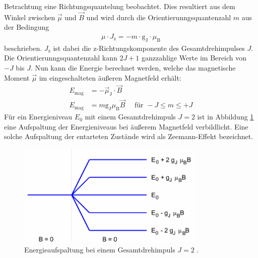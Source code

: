 Betrachtung eine Richtungsquantelung beobachtet. Dies resultiert aus dem Winkel
zwischen $\vec{\mu}$ und $\vec{B}$ und wird durch die
Orientierunngsquantenzahl $m$ aus der Bedingung
\begin{align}
  \mu \cdot J_\text{z} = - m \cdot \text{g}_\text{J}\cdot \mu_\text{B}
  \label{eqn:bedingung}
\end{align}
beschrieben. $J_\text{z}$ ist dabei die z-Richtungskomponente des Gesamtdrehimpulses
$J$. Die Orientierunngsquantenzahl kann $2J+1$ ganzzahlige Werte im Bereich von
$-J$ bis $J$.
Nun kann die Energie berechnet werden, welche das magnetische Moment $\vec{\mu}$
im eingeschalteten äußeren Magnetfeld erhält:
\begin{align}
  E_\text{mag} &= -\vec{\mu}_\text{J} \cdot \vec{B} \\
  E_\text{mag} &= m \text{g}_\text{J} \mu_\text{B}\vec{B} \quad \text{ für } -J\leq m\leq+J
  \label{eqn:energie}
\end{align}
Für ein Energieniveau $E_0$ mit einem Gesamtdrehimpuls $J = \num{2}$ ist in Abbildung
\ref{abb:aufspaltung} eine Aufspaltung der Energieniveaus bei äußerem Magnetfeld
verbildlicht. Eine solche Aufspaltung der entarteten Zustände wird als Zeemann-Effekt
bezeichnet.
\begin{figure}[htb]
  \centering
  \includegraphics[width=0.8\textwidth]{images/V27_1.pdf}
  \caption{Energieaufspaltung bei einem Gesamtdrehimpuls $J = \num{2}$ \cite{anleitung}.}
  \label{abb:aufspaltung}
\end{figure}

